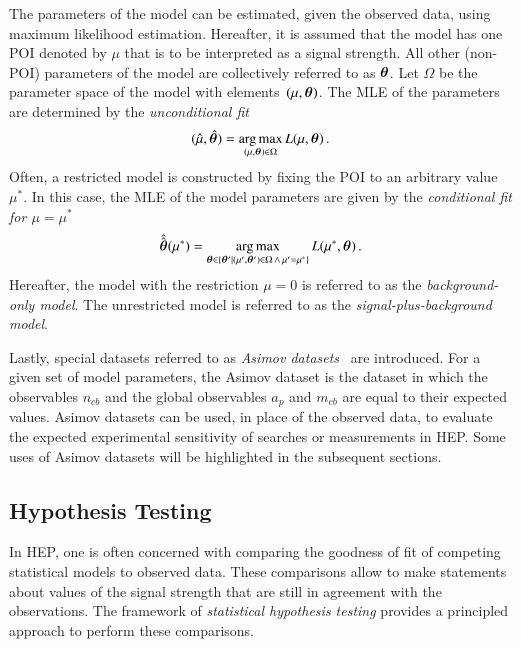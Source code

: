 The parameters of the model can be estimated, given the observed data, using
maximum likelihood estimation. Hereafter, it is assumed that the model has one
POI denoted by $\mu$ that is to be interpreted as a signal strength. All other
(non-POI) parameters of the model are collectively referred to as
$\bm{\theta}$. Let $\Omega$ be the parameter space of the model with
elements~$(\mu, \bm{\theta})$. The MLE of the parameters are determined by
the \emph{unconditional fit}
\begin{align}
  (\hat{\mu}, \hat{\bm{\theta}}) = \operatorname*{arg\,max}_{(\mu, \bm{\theta}) \in \Omega} L(\mu, \bm{\theta}) \,\text{.}
  \label{eq:unconditional_fit}
\end{align}
Often, a restricted model is constructed by fixing the POI to an arbitrary value
$\mu^*$. In this case, the MLE of the model parameters are given by the
\emph{conditional fit for $\mu = \mu^*$}
\begin{align}
  \hat{\hat{\bm{\theta}}}(\mu^*) = \operatorname*{arg\,max}_{\bm{\theta} \in \{ \bm{\theta}^\prime \mid (\mu^\prime, \bm{\theta}^\prime) \in \Omega \,\land\, \mu^\prime = \mu^* \} } L(\mu^*, \bm{\theta}) \,\text{.}
  \label{eq:conditional_fit}
\end{align}
Hereafter, the model with the restriction $\mu = 0$ is referred to as the
\emph{background-only model}. The unrestricted model is referred to as the
\emph{signal-plus-background model}.

Lastly, special datasets referred to as \emph{Asimov
  datasets}~\cite{Cowan:2010js} are introduced. For a given set of model
parameters, the Asimov dataset is the dataset in which the observables $n_{cb}$
and the global observables $a_p$ and $m_{cb}$ are equal to their expected
values. Asimov datasets can be used, in place of the observed data, to evaluate
the expected experimental sensitivity of searches or measurements in HEP. Some
uses of Asimov datasets will be highlighted in the subsequent sections.


\subsection{Hypothesis Testing}%
\label{sec:hypotesting}

In HEP, one is often concerned with comparing the goodness of fit of competing
statistical models to observed data. These comparisons allow to make statements
about values of the signal strength that are still in agreement with the
observations. The framework of \emph{statistical hypothesis testing} provides a
principled approach to perform these comparisons.


